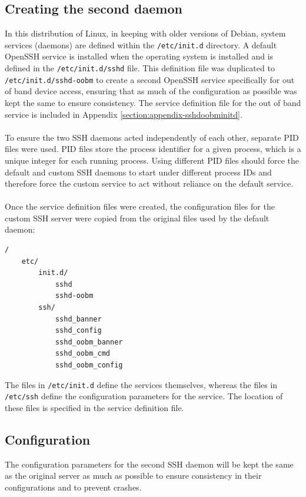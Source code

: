 \subsection{Creating the second daemon}
\label{subsection:dev-sshdaemon-creating}
In this distribution of Linux, in keeping with older versions of Debian, system services (daemons) are defined within the \verb|/etc/init.d| directory. A default OpenSSH service is installed when the operating system is installed and is defined in the \verb|/etc/init.d/sshd| file. This definition file was duplicated to \verb|/etc/init.d/sshd-oobm| to create a second OpenSSH service specifically for out of band device access, ensuring that as much of the configuration as possible was kept the same to ensure consistency. The service definition file for the out of band service is included in Appendix \ref{section:appendix-sshdoobminitd}.\\\\
To ensure the two SSH daemons acted independently of each other, separate PID files were used. PID files store the process identifier for a given process, which is a unique integer for each running process. Using different PID files should force the default and custom SSH daemons to start under different process IDs and therefore force the custom service to act without reliance on the default service.\\\\
Once the service definition files were created, the configuration files for the custom SSH server were copied from the original files used by the default daemon:
\begin{verbatim}
/
    etc/
        init.d/
            sshd
            sshd-oobm
        ssh/
            sshd_banner
            sshd_config
            sshd_oobm_banner
            sshd_oobm_cmd
            sshd_oobm_config
\end{verbatim}
\label{fig:4-filetree}
The files in \verb|/etc/init.d| define the services themselves, whereas the files in \verb|/etc/ssh| define the configuration parameters for the service. The location of these files is specified in the service definition file.

\subsection{Configuration}
\label{subsection:dev-sshdaemon-configuration}
The configuration parameters for the second SSH daemon will be kept the same as the original server as much as possible to ensure consistency in their configurations and to prevent crashes.
